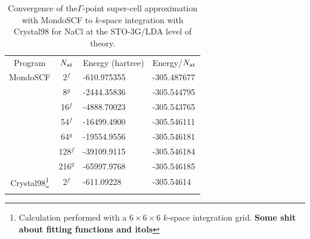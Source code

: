 \commentoutA{\documentclass[prb,aps,twocolumn,showpacs,twocolumngrid,superbib]{revtex4}}
\begin{document}
\begin{table}
\caption{Convergence of the$\Gamma$-point super-cell approximation with {\sc MondoSCF} to 
         $k$-space integration with {\sc Crystal98} for NaCl at the STO-3G/LDA level
         of theory.}\label{NaClGammaPt}



\begin{tabular}{ccll}
\toprule

Program         & $N_{\rm at}$              & Energy (hartree) & Energy/$N_{\rm at}$\\ 

\colrule

{\sc MondoSCF}  & 2$^f$    &   -610.975355  & -305.487677   \\
                & 8$^g$    &  -2444.35836   & -305.544795   \\
                & 16$^f$   &  -4888.70023   & -305.543765   \\
                & 54$^f$   & -16499.4900    & -305.546111   \\
                & 64$^g$   & -19554.9556    & -305.546181   \\
                & 128$^f$  & -39109.9115    & -305.546184   \\
                & 216$^g$  & -65997.9768    & -305.546185   \\ 
\hline

{\sc Crystal98}\footnote[8]{Calculation performed with a $6\times6\times6$
                            $k$-space integration grid.  {\bf Some shit about fitting functions and itols}}
                & 2$^f$    &  -611.09228    & -305.54614    \\ 

\botrule
\end{tabular}
\end{table}
\end{document}
